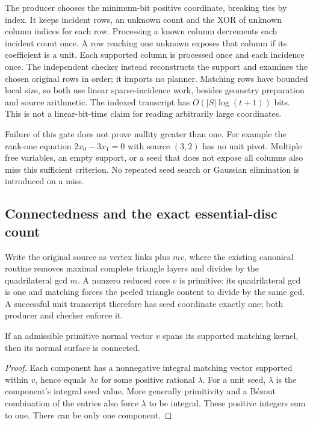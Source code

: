 The producer chooses the minimum-bit positive coordinate, breaking ties by
index. It keeps incident rows, an unknown count and the XOR of unknown
column indices for each row. Processing a known column decrements each
incident count once. A row reaching one unknown exposes that column if its
coefficient is a unit. Each supported column is processed once and each
incidence once. The independent checker instead reconstructs the support
and examines the chosen original rows in order; it imports no planner.
Matching rows have bounded local size, so both use linear sparse-incidence
work, besides geometry preparation and source arithmetic. The indexed
transcript has $O(|S|\log(t+1))$ bits. This is not a linear-bit-time claim
for reading arbitrarily large coordinates.

Failure of this gate does not prove nullity greater than one. For example
the rank-one equation $2x_0-3x_1=0$ with source $(3,2)$ has no unit pivot.
Multiple free variables, an empty support, or a seed that does not expose
all columns also miss this sufficient criterion. No repeated seed search
or Gaussian elimination is introduced on a miss.

\subsection{Connectedness and the exact essential-disc count}

Write the original source as vertex links plus $m v$, where the existing
canonical routine removes maximal complete triangle layers and divides by
the quadrilateral gcd $m$. A nonzero reduced core $v$ is primitive: its
quadrilateral gcd is one and matching forces the peeled triangle content
to divide by the same gcd. A successful unit transcript therefore has
seed coordinate exactly one; both producer and checker enforce it.

\begin{lemma}
If an admissible primitive normal vector $v$ spans its supported matching
kernel, then its normal surface is connected.
\end{lemma}
\begin{proof}
Each component has a nonnegative integral matching vector supported within
$v$, hence equals $\lambda v$ for some positive rational $\lambda$.
For a unit seed, $\lambda$ is the component's integral seed value. More
generally primitivity and a B\'ezout combination of the entries also force
$\lambda$ to be integral. These positive integers sum to one. There can
be only one component.
\end{proof}

